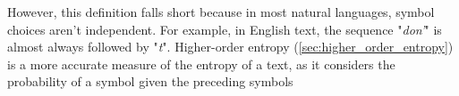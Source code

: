 \noindent However, this definition falls short because in most natural languages, symbol choices aren't independent. For example, in English text, the sequence "\emph{don'}" is almost always followed by "\emph{t}". Higher-order entropy (\autoref{sec:higher_order_entropy}) is a more accurate measure of the entropy of a text, as it considers the probability of a symbol given the preceding symbols
